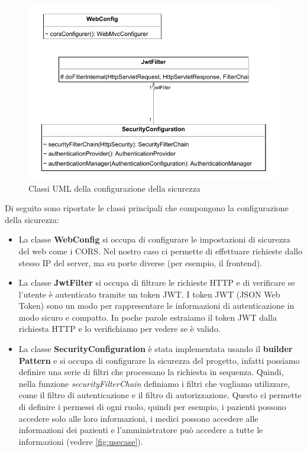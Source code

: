 \documentclass[a4paper]{article}
\begin{document}
\begin{figure}[H]
  \begin{center}
    \includegraphics[width=1\textwidth]{config.pdf}
  \end{center}
  \caption{Classi UML della configurazione della sicurezza} 
\end{figure}
\noindent
Di seguito sono riportate le classi principali che compongono la configurazione della sicurezza:
\begin{itemize}
  \item La classe \textbf{WebConfig} si occupa di configurare le impostazioni di sicurezza del web come i CORS.
  Nel nostro caso ci permette di effettuare richieste dallo stesso IP del server, ma su porte diverse (per esempio, il frontend).
  \item La classe \textbf{JwtFilter} si occupa di filtrare le richieste HTTP e di verificare se l'utente è autenticato tramite un token JWT.
  I token JWT (JSON Web Token) sono un modo per rappresentare le informazioni di autenticazione in modo sicuro e compatto.
  In poche parole estraiamo il token JWT dalla richiesta HTTP e lo verifichiamo per vedere se è valido.
  \item La classe \textbf{SecurityConfiguration} è stata implementata usando il \textbf{builder Pattern} e si occupa di configurare la sicurezza del progetto,
  infatti possiamo definire una serie di filtri che processano la richiesta in sequenza.
  Quindi, nella funzione \textit{securityFilterChain} definiamo i filtri che vogliamo utilizzare, come il filtro di autenticazione e il filtro di autorizzazione.
  Questo ci permette di definire i permessi di ogni ruolo, quindi per esempio, i pazienti possono accedere solo alle loro informazioni, i medici possono accedere alle informazioni dei pazienti 
  e l'amministratore può accedere a tutte le informazioni (vedere \ref{fig:usecase}).
\end{itemize}
\end{document}
